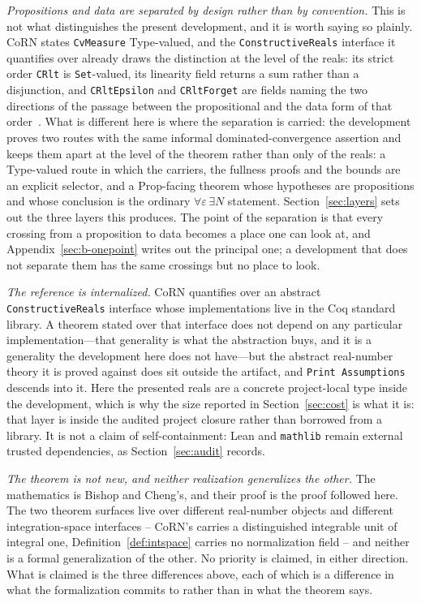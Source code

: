 \documentclass[11pt]{article}
\theoremstyle{definition}
\theoremstyle{remark}
\begin{document}
\emph{Propositions and data are separated by design rather than by convention.}  This
is not what distinguishes the present development, and it is worth saying so plainly.
CoRN states \texttt{CvMeasure} Type-valued, and the \texttt{ConstructiveReals}
interface it quantifies over already draws the distinction at the level of the reals:
its strict order \texttt{CRlt} is \texttt{Set}-valued, its linearity field returns a
sum rather than a disjunction, and \texttt{CRltEpsilon} and \texttt{CRltForget} are
fields naming the two directions of the passage between the propositional and the
data form of that order~\cite{coq-constructive-reals}.  What is different here is
where the separation is carried: the development proves two routes with the
same informal dominated-convergence assertion and keeps them apart at the level of the
theorem rather than only of the reals: a Type-valued route in which the
carriers, the fullness proofs and the bounds are an explicit selector, and a
Prop-facing theorem whose hypotheses are propositions and whose conclusion is the
ordinary $\forall\varepsilon\,\exists N$ statement.  Section~\ref{sec:layers} sets out
the three layers this produces.  The point of the separation is that every crossing
from a proposition to data becomes a place one can look at, and Appendix~\ref{sec:b-onepoint}
writes out the principal one; a development that does not separate them has the same
crossings but no place to look.

\emph{The reference is internalized.}  CoRN quantifies over an abstract
\texttt{ConstructiveReals} interface whose implementations live in the Coq standard
library.  A theorem stated over that interface does not depend on any particular
implementation---that generality is what the abstraction buys, and it is a generality
the development here does not have---but the abstract real-number theory it is proved
against does sit outside the artifact, and \texttt{Print Assumptions} descends into
it.
Here the presented reals are a concrete project-local type inside the development,
which is why the size reported in Section~\ref{sec:cost} is what it is: that layer is
inside the audited project closure rather than borrowed from a library.  It is not a
claim of self-containment: Lean and \texttt{mathlib} remain external trusted
dependencies, as Section~\ref{sec:audit} records.

\emph{The theorem is not new, and neither realization generalizes the other.}  The
mathematics is Bishop and Cheng's, and their proof is the proof followed here.  The
two theorem surfaces live over different real-number objects and different
integration-space interfaces -- CoRN's carries a distinguished integrable unit of
integral one, Definition~\ref{def:intspace} carries no normalization field -- and
neither is a formal generalization of the other.  No priority is claimed, in either
direction.  What is claimed is the three differences above, each of which is a
difference in what the formalization commits to rather than in what the theorem says.
\end{document}
